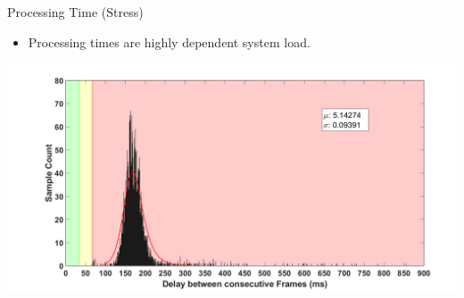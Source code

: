 \documentclass[18pt]{beamer}
\begin{document}
\begin{frame}{Processing Time (Stress)}
\begin{itemize}
    \item Processing times are highly dependent system load.
\end{itemize}
    \includegraphics[width=\textwidth]{figures/graphs/dist_stress_yolact_mobilenetv2.png}
\end{frame}
\end{document}
